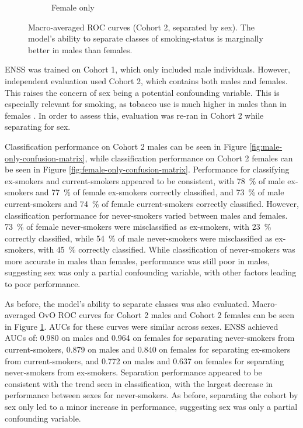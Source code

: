 \documentclass[draft]{article} %
\begin{document}
\begin{figure}[!p]
\begin{subfigure}{0.42\linewidth}
        \caption{Female only}
    \end{subfigure}
    \caption[Macro-averaged ROC curves (Cohort 2, separated by sex)]{Macro-averaged ROC curves (Cohort 2, separated by sex). The model's ability to separate classes of smoking-status is marginally better in males than females.}
    \label{fig:sex-sep-macro-rocs}
\end{figure}

ENSS was trained on Cohort 1, which only included male individuals. However, independent evaluation used Cohort 2, which contains both males and females. This raises the concern of sex being a potential confounding variable. This is especially relevant for smoking, as tobacco use is much higher in males than in females \cite{WHO2021Tobacco, higgins2015literature}. In order to assess this, evaluation was re-ran in Cohort 2 while separating for sex.

Classification performance on Cohort 2 males can be seen in Figure \ref{fig:male-only-confusion-matrix}, while classification performance on Cohort 2 females can be seen in Figure \ref{fig:female-only-confusion-matrix}. Performance for classifying ex-smokers and current-smokers appeared to be consistent, with \SI{78}{\percent} of male ex-smokers and \SI{77}{\percent} of female ex-smokers correctly classified, and \SI{73}{\percent} of male current-smokers and \SI{74}{\percent} of female current-smokers correctly classified. However, classification performance for never-smokers varied between males and females. \SI{73}{\percent} of female never-smokers were misclassified as ex-smokers, with \SI{23}{\percent} correctly classified, while \SI{54}{\percent} of male never-smokers were misclassified as ex-smokers, with \SI{45}{\percent} correctly classified. While classification of never-smokers was more accurate in males than females, performance was still poor in males, suggesting sex was only a partial confounding variable, with other factors leading to poor performance.

As before, the model's ability to separate classes was also evaluated. Macro-averaged OvO ROC curves for Cohort 2 males and Cohort 2 females can be seen in Figure \ref{fig:sex-sep-macro-rocs}. AUCs for these curves were similar across sexes.
ENSS achieved AUCs of: 0.980 on males and 0.964 on females for separating never-smokers from current-smokers, 0.879 on males and 0.840 on females for separating ex-smokers from current-smokers, and 0.772 on males and 0.637 on females for separating never-smokers from ex-smokers. Separation performance appeared to be consistent with the trend seen in classification, with the largest decrease in performance between sexes for never-smokers. As before, separating the cohort by sex only led to a minor increase in performance, suggesting sex was only a partial confounding variable.
\end{document}

